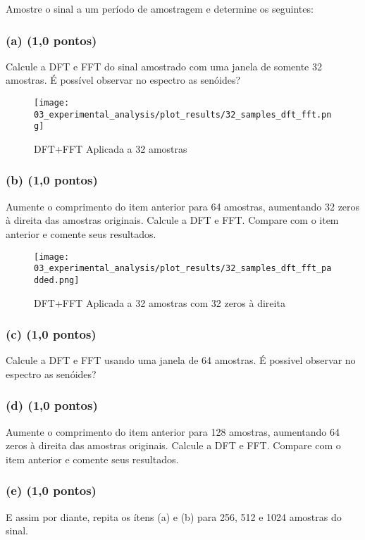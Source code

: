 Amostre o sinal  a um período de amostragem e determine os seguintes:

\subsubsection*{(a) \textbf{(1,0 pontos) }}
Calcule a DFT e FFT do sinal amostrado com uma janela de somente 32 amostras. É possível observar no espectro as senóides?

\begin{figure}[H]
    \centering
    \texttt{[image: 03\_experimental\_analysis/plot\_results/32\_samples\_dft\_fft.png]}
    \caption{DFT+FFT Aplicada a 32 amostras}
    \label{fig:signal_32samples_fft-dft}
\end{figure}

\subsubsection*{(b) \textbf{(1,0 pontos)}}
Aumente o comprimento do item anterior para 64 amostras, aumentando 32 zeros à direita das amostras originais. Calcule a DFT e FFT. Compare com o item anterior e comente seus resultados.

\begin{figure}[H]
    \centering
    \texttt{[image: 03\_experimental\_analysis/plot\_results/32\_samples\_dft\_fft\_padded.png]}
    \caption{DFT+FFT Aplicada a 32 amostras com 32 zeros à direita}
    \label{fig:signal_32samples_fft-dft_padded}
\end{figure}

\subsubsection*{(c) \textbf{(1,0 pontos)}}
Calcule a DFT e FFT usando uma janela de 64 amostras. É possivel observar no espectro as senóides?

\subsubsection*{(d) \textbf{(1,0 pontos)}}
Aumente o comprimento do item anterior para 128 amostras, aumentando 64 zeros à direita das amostras originais. Calcule a DFT e FFT. Compare com o item anterior e comente seus resultados.

\subsubsection*{(e) \textbf{(1,0 pontos)}}
E assim por diante, repita os ítens (a) e (b) para 256, 512 e 1024 amostras do sinal.


